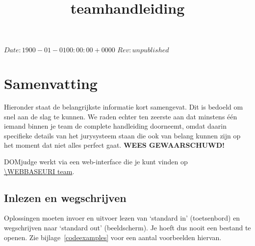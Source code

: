 

\usepackage[dutch]{babel}

\renewcommand{\versionrevison}{Versie/revisie}
\renewcommand{\lastmodified}{Laatst gewijzigd}
\renewcommand{\generated}{Gegenereerd}

\SVN $Date: 1900-01-01 00:00:00 +0000 $
\SVN $Rev: unpublished $

\title{\DOMjudge teamhandleiding}




\titlestuff{\DOMJUDGEVERSION}{\SVNRev}{\SVNDate}{\today}

\section*{Samenvatting}

Hieronder staat de belangrijkste informatie kort samengevat. Dit is
bedoeld om snel aan de slag te kunnen. We raden echter ten zeerste
aan dat minstens \'e\'en iemand binnen je team de complete handleiding
doorneemt, omdat daarin specifieke details van het jurysysteem staan
die ook van belang kunnen zijn op het moment dat niet alles perfect
gaat. \textbf{WEES GEWAARSCHUWD!}

DOMjudge werkt via een web-interface die je kunt vinden op \\
\url{\WEBBASEURI team}.

\subsection*{Inlezen en wegschrijven}

Oplossingen moeten invoer en uitvoer lezen van `standard in'
(toetsenbord) en wegschrijven naar `standard out' (beeldscherm). Je
hoeft dus nooit een bestand te openen. Zie bijlage~\ref{codeexamples}
voor een aantal voorbeelden hiervan.

